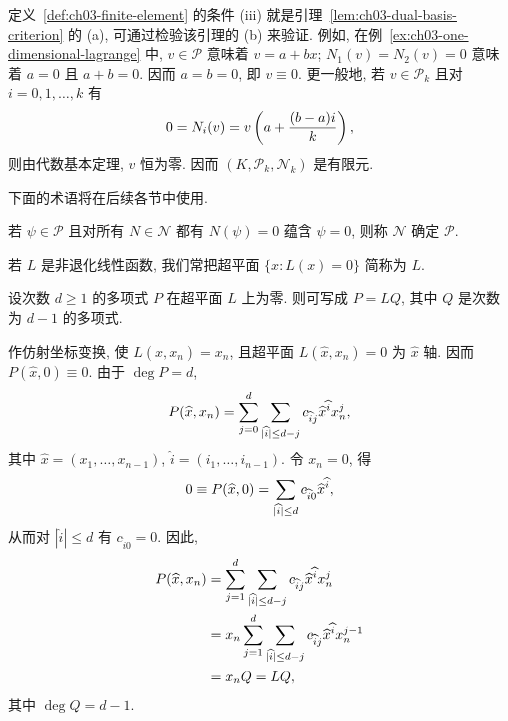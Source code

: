 \setcounter{thmcount}{6}
\begin{Remark}
\label{rem:ch03-dual-basis-verification}
定义~\ref{def:ch03-finite-element} 的条件 (iii) 就是引理~\ref{lem:ch03-dual-basis-criterion} 的 (a), 可通过检验该引理的 (b) 来验证. 例如, 在例~\ref{ex:ch03-one-dimensional-lagrange} 中, $v\in\mathcal P$ 意味着 $v=a+bx$; $N_1(v)=N_2(v)=0$ 意味着 $a=0$ 且 $a+b=0$. 因而 $a=b=0$, 即 $v\equiv0$. 更一般地, 若 $v\in\mathcal P_k$ 且对 $i=0,1,\ldots,k$ 有
\[
\MathBookFormulaID{formula-ch03-polynomial-nodal-zeros}
0=N_i(v)=v\left(a+\frac{(b-a)i}{k}\right),
\]
则由代数基本定理, $v$ 恒为零. 因而 $(K,\mathcal P_k,\mathcal N_k)$ 是有限元.
\end{Remark}

下面的术语将在后续各节中使用.

\begin{Definition}
\label{def:ch03-n-determines-p}
若 $\psi\in\mathcal P$ 且对所有 $N\in\mathcal N$ 都有 $N(\psi)=0$ 蕴含 $\psi=0$, 则称 $\mathcal N$ 确定 $\mathcal P$.
\end{Definition}

\begin{Remark}
\label{rem:ch03-hyperplane-notation}
若 $L$ 是非退化线性函数, 我们常把超平面 $\{x:L(x)=0\}$ 简称为 $L$.
\end{Remark}

\begin{Lemma}
\label{lem:ch03-polynomial-hyperplane-factor}
设次数 $d\geq1$ 的多项式 $P$ 在超平面 $L$ 上为零. 则可写成 $P=LQ$, 其中 $Q$ 是次数为 $d-1$ 的多项式.
\end{Lemma}

\begin{Proof}
作仿射坐标变换, 使 $L(\widehat x,x_n)=x_n$, 且超平面 $L(\widehat x,x_n)=0$ 为 $\widehat x$ 轴. 因而 $P(\widehat x,0)\equiv0$. 由于 $\deg P=d$,
\[
\MathBookFormulaID{formula-ch03-polynomial-multiindex-expansion}
P(\widehat x,x_n)=\sum_{j=0}^d\sum_{|\widehat i|\leq d-j}
c_{\widehat i j}\widehat x^{\widehat i}x_n^j,
\]
其中 $\widehat x=(x_1,\ldots,x_{n-1})$, $\widehat i=(i_1,\ldots,i_{n-1})$. 令 $x_n=0$, 得
\[
\MathBookFormulaID{formula-ch03-polynomial-zero-hyperplane-coefficients}
0\equiv P(\widehat x,0)=\sum_{|\widehat i|\leq d}c_{\widehat i0}\widehat x^{\widehat i},
\]
从而对 $|\widehat i|\leq d$ 有 $c_{\widehat i0}=0$. 因此,
\[
\MathBookFormulaID{formula-ch03-polynomial-factorization-proof}
\begin{aligned}
P(\widehat x,x_n)
&=\sum_{j=1}^d\sum_{|\widehat i|\leq d-j}
c_{\widehat i j}\widehat x^{\widehat i}x_n^j\\
&=x_n\sum_{j=1}^d\sum_{|\widehat i|\leq d-j}
c_{\widehat i j}\widehat x^{\widehat i}x_n^{j-1}\\
&=x_nQ=LQ,
\end{aligned}
\]
其中 $\deg Q=d-1$.
\end{Proof}

